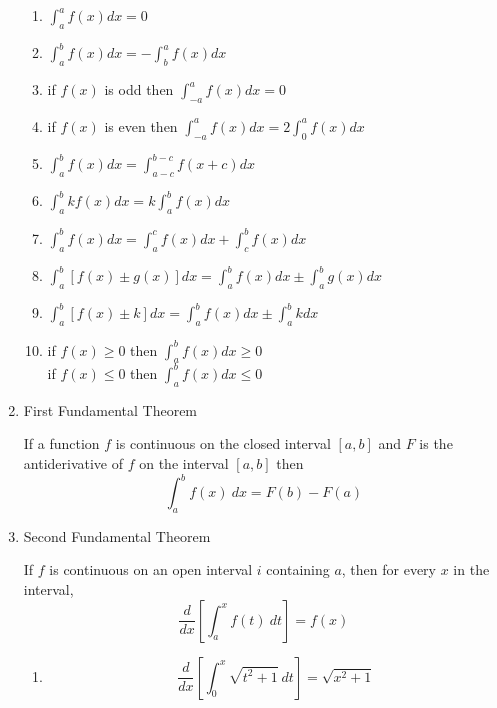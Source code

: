 \documentclass[fleqn]{article}
\begin{document}
\begin{enumerate}
\begin {enumerate}
\item $\int _a^a f(x)dx = 0$

\item $\int _a^b f(x)dx = - \int _b^a f(x)dx$

\item if $f(x)$ is odd then $\int _{-a}^a f(x)dx = 0$

\item if $f(x)$ is even then $\int _{-a}^a f(x)dx = 2\int _0^a f(x)dx$

\item $\int _a^b f(x)dx = \int _{a-c}^{b-c }f(x+c)dx$

\item $\int _a^b kf(x)dx = k\int _a^b f(x)dx$

\item $\int _a^b f(x)dx = \int _a^c f(x)dx + \int _c^b f(x)dx$

\item $\int _a^b \left[f(x) \pm g(x) \right]dx = \int _a^b f(x)dx \pm \int _a^b g(x)dx$

\item $\int _a^b \left[f(x) \pm k \right]dx = \int _a^b f(x)dx \pm \int _a^b kdx$

\item if $f(x) \geq 0$ then $\int _a^b f(x)dx \geq 0$\\
if $f(x) \leq 0$ then $\int _a^b f(x)dx \leq 0$

\end{enumerate}

\item First Fundamental Theorem

If a function $f$ is continuous on the closed interval $[a,b]$ and $F$ is the antiderivative of $f$ on the interval $[a,b]$ then
\begin{equation*}
 \int_a^b f(x) \ dx = F(b) - F(a)
 \end{equation*}

\item Second Fundamental Theorem

If $f$ is continuous on an open interval $i$ containing $a$, then for every $x$ in the interval,
\begin{equation*}
\frac{d}{dx} \left [ \int_a^x f(t) \ dt \right ] = f(x)
\end{equation*}

\begin {enumerate}

\item 
\begin{equation*}
\frac{d}{dx}\left[\int_0^x \sqrt{t^2+1} \ dt\right] = \sqrt{x^2+1}
\end{equation*}


\end{enumerate}
\end{enumerate}
\end{document}
